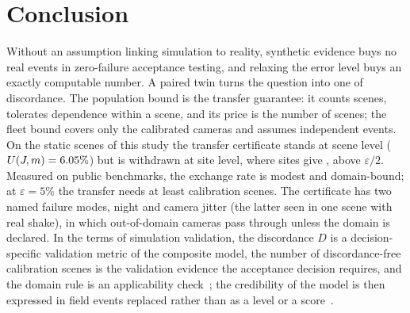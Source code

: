 \section{Conclusion}\label{sec:conclusion}
Without an assumption linking simulation to reality, synthetic evidence buys no real events in zero-failure
acceptance testing, and relaxing the error level buys an exactly computable number. A paired twin turns the question into
one of discordance. The population bound is the transfer guarantee: it counts scenes, tolerates dependence within a
scene, and its price is the number of scenes; the fleet bound covers only the calibrated cameras and assumes independent
events. On the \nMainScenes{} static scenes of this study the transfer certificate stands at scene level
($U(J,m)=6.05\%$) but is withdrawn at site level, where \nSiteSm{} sites give \nSiteSU, above $\varepsilon/2$.
Measured on public benchmarks, the exchange rate is modest and domain-bound; at $\varepsilon=5\%$ the transfer needs at
least \nPopScenesQuarter{} calibration scenes. The certificate has two named failure modes, night and camera jitter
(the latter seen in one scene with real shake), in which out-of-domain cameras pass through unless the domain is
declared. In the terms of simulation validation, the discordance $D$ is a decision-specific validation metric of the
composite model, the number of discordance-free calibration scenes is the validation evidence the acceptance decision
requires, and the domain rule is an applicability check~\cite{pathmanathan2017applicability}; the credibility of the
model is then expressed in field events replaced rather than as a level or a
score~\cite{sargent2013vv,asme2018vv40}.

